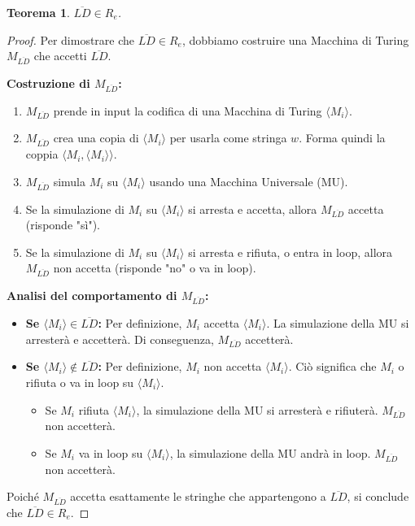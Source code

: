 \documentclass[a4paper, 11pt]{book} %
\newtheorem{theorem}{Teorema}[section]
\theoremstyle{definition}
\begin{document}
\begin{theorem}
$\overline{LD} \in R_e$.
\end{theorem}
\begin{proof}
Per dimostrare che $\overline{LD} \in R_e$, dobbiamo costruire una Macchina di Turing $M_{\overline{LD}}$ che accetti $\overline{LD}$.

\textbf{Costruzione di $M_{\overline{LD}}$:}
\begin{enumerate}
    \item $M_{\overline{LD}}$ prende in input la codifica di una Macchina di Turing $\langle M_i \rangle$.
    \item $M_{\overline{LD}}$ crea una copia di $\langle M_i \rangle$ per usarla come stringa $w$. Forma quindi la coppia $\langle M_i, \langle M_i \rangle \rangle$.
    \item $M_{\overline{LD}}$ simula $M_i$ su $\langle M_i \rangle$ usando una Macchina Universale (MU).
    \item Se la simulazione di $M_i$ su $\langle M_i \rangle$ si arresta e accetta, allora $M_{\overline{LD}}$ accetta (risponde "sì").
    \item Se la simulazione di $M_i$ su $\langle M_i \rangle$ si arresta e rifiuta, o entra in loop, allora $M_{\overline{LD}}$ non accetta (risponde "no" o va in loop).
\end{enumerate}
\textbf{Analisi del comportamento di $M_{\overline{LD}}$:}
\begin{itemize}
    \item \textbf{Se $\langle M_i \rangle \in \overline{LD}$:}
    Per definizione, $M_i$ accetta $\langle M_i \rangle$. La simulazione della MU si arresterà e accetterà. Di conseguenza, $M_{\overline{LD}}$ accetterà.
    \item \textbf{Se $\langle M_i \rangle \notin \overline{LD}$:}
    Per definizione, $M_i$ non accetta $\langle M_i \rangle$. Ciò significa che $M_i$ o rifiuta o va in loop su $\langle M_i \rangle$.
    \begin{itemize}
        \item Se $M_i$ rifiuta $\langle M_i \rangle$, la simulazione della MU si arresterà e rifiuterà. $M_{\overline{LD}}$ non accetterà.
        \item Se $M_i$ va in loop su $\langle M_i \rangle$, la simulazione della MU andrà in loop. $M_{\overline{LD}}$ non accetterà.
    \end{itemize}
\end{itemize}
Poiché $M_{\overline{LD}}$ accetta esattamente le stringhe che appartengono a $\overline{LD}$, si conclude che $\overline{LD} \in R_e$.
\end{proof}
\end{document}
